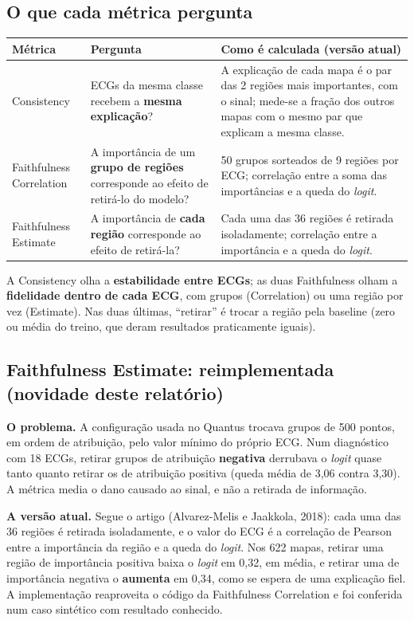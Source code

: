\documentclass[11pt,a4paper]{article}
\begin{document}
\subsection{O que cada métrica pergunta}
\begin{table}[H]
\centering
\small
\begin{tabularx}{\textwidth}{lXX}
\toprule
\textbf{Métrica} & \textbf{Pergunta} & \textbf{Como é calculada (versão atual)} \\
\midrule
Consistency & ECGs da mesma classe recebem a \textbf{mesma explicação}? & A explicação de cada mapa é o par das 2 regiões mais importantes, com o sinal; mede-se a fração dos outros mapas com o mesmo par que explicam a mesma classe. \\
\addlinespace
Faithfulness Correlation & A importância de um \textbf{grupo de regiões} corresponde ao efeito de retirá-lo do modelo? & 50 grupos sorteados de 9 regiões por ECG; correlação entre a soma das importâncias e a queda do \textit{logit}. \\
\addlinespace
Faithfulness Estimate & A importância de \textbf{cada região} corresponde ao efeito de retirá-la? & Cada uma das 36 regiões é retirada isoladamente; correlação entre a importância e a queda do \textit{logit}. \\
\bottomrule
\end{tabularx}
\end{table}
A Consistency olha a \textbf{estabilidade entre ECGs}; as duas Faithfulness olham a \textbf{fidelidade dentro de cada ECG}, com grupos (Correlation) ou uma região por vez (Estimate). Nas duas últimas, “retirar” é trocar a região pela baseline (zero ou média do treino, que deram resultados praticamente iguais).

\subsection{Faithfulness Estimate: reimplementada (novidade deste relatório)}
\textbf{O problema.} A configuração usada no Quantus trocava grupos de 500 pontos, em ordem de atribuição, pelo valor mínimo do próprio ECG. Num diagnóstico com 18 ECGs, retirar grupos de atribuição \textbf{negativa} derrubava o \textit{logit} quase tanto quanto retirar os de atribuição positiva (queda média de 3,06 contra 3,30). A métrica media o dano causado ao sinal, e não a retirada de informação.

\textbf{A versão atual.} Segue o artigo (Alvarez-Melis e Jaakkola, 2018): cada uma das 36 regiões é retirada isoladamente, e o valor do ECG é a correlação de Pearson entre a importância da região e a queda do \textit{logit}. Nos 622 mapas, retirar uma região de importância positiva baixa o \textit{logit} em 0,32, em média, e retirar uma de importância negativa o \textbf{aumenta} em 0,34, como se espera de uma explicação fiel. A implementação reaproveita o código da Faithfulness Correlation e foi conferida num caso sintético com resultado conhecido.
\end{document}
